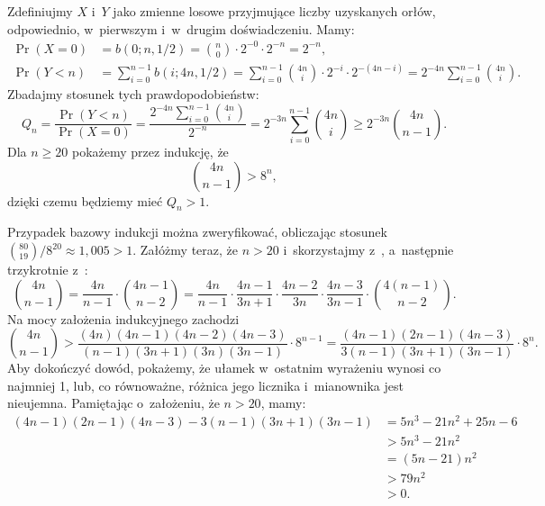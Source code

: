 
\exercise %
Zdefiniujmy $X$ i~$Y$ jako zmienne losowe przyjmujące liczby uzyskanych orłów, odpowiednio, w~pierwszym i~w~drugim doświadczeniu.
Mamy:
\begin{align*}
	\Pr(X=0) &= b(0;n,1/2) = \binom{n}{0}\cdot2^{-0}\cdot2^{-n} = 2^{-n}, \\
	\Pr(Y<n) &= \sum_{i=0}^{n-1}b(i;4n,1/2) = \sum_{i=0}^{n-1}\binom{4n}{i}\cdot2^{-i}\cdot2^{-(4n-i)} = 2^{-4n}\sum_{i=0}^{n-1}\binom{4n}{i}.
\end{align*}
Zbadajmy stosunek tych prawdopodobieństw:
\[
    Q_n = \frac{\Pr(Y<n)}{\Pr(X=0)} = \frac{2^{-4n}\sum_{i=0}^{n-1}\binom{4n}{i}}{2^{-n}} = 2^{-3n}\sum_{i=0}^{n-1}\binom{4n}{i} \ge 2^{-3n}\binom{4n}{n-1}.
\]
Dla $n\ge20$ pokażemy przez indukcję, że
\[
	\binom{4n}{n-1} > 8^n,
\]
dzięki czemu będziemy mieć $Q_n>1$.

Przypadek bazowy indukcji można zweryfikować, obliczając stosunek $\binom{80}{19}/8^{20}\approx1{,}005>1$.
Załóżmy teraz, że $n>20$ i~skorzystajmy z~, a~następnie trzykrotnie z~:
\[
    \binom{4n}{n-1} = \frac{4n}{n-1}\cdot\binom{4n-1}{n-2} = \frac{4n}{n-1}\cdot\frac{4n-1}{3n+1}\cdot\frac{4n-2}{3n}\cdot\frac{4n-3}{3n-1}\cdot\binom{4(n-1)}{n-2}.
\]
Na mocy założenia indukcyjnego zachodzi
\[
    \binom{4n}{n-1} > \frac{(4n)(4n-1)(4n-2)(4n-3)}{(n-1)(3n+1)(3n)(3n-1)}\cdot8^{n-1} = \frac{(4n-1)(2n-1)(4n-3)}{3(n-1)(3n+1)(3n-1)}\cdot8^n.
\]
Aby dokończyć dowód, pokażemy, że ułamek w~ostatnim wyrażeniu wynosi co najmniej 1, lub, co równoważne, różnica jego licznika i~mianownika jest nieujemna.
Pamiętając o~założeniu, że $n>20$, mamy:
\begin{align*}
	(4n-1)(2n-1)(4n-3)-3(n-1)(3n+1)(3n-1) &= 5n^3-21n^2+25n-6 \\
	&> 5n^3-21n^2 \\
	&= (5n-21)n^2 \\
	&> 79n^2 \\
	&> 0.
\end{align*}

